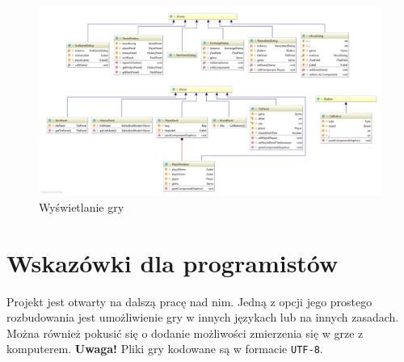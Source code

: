 \documentclass[a4paper]{article}
\begin{document}
\begin{figure}[!hb]
\centering
\includegraphics[width=\textwidth]{swing.png}
\caption{Wyświetlanie gry}
\end{figure}

\section{Wskazówki dla programistów}
Projekt jest otwarty na dalszą pracę nad nim. Jedną z opcji jego prostego rozbudowania jest umożliwienie gry w innych językach lub na innych zasadach. Można również pokusić się o dodanie możliwości zmierzenia się w grze z komputerem. \textbf{Uwaga!} Pliki gry kodowane są w formacie \texttt{UTF-8}.
\end{document}
